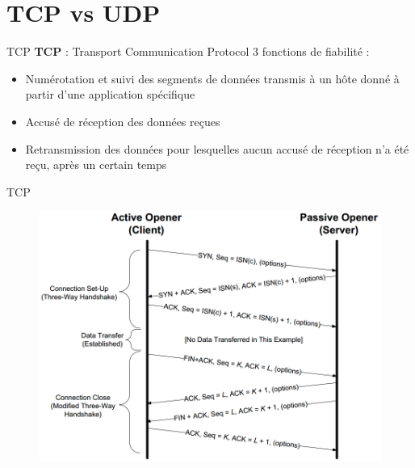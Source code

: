 \documentclass{beamer}
\begin{document}
\section{TCP vs UDP}

	\begin{frame}{TCP}
		\textbf{TCP} : Transport Communication Protocol
		3 fonctions de fiabilité : 
		\begin{itemize}
			\item[\textbullet] Numérotation et suivi des segments de données transmis à un hôte donné à partir d'une application spécifique
			\item[\textbullet] Accusé de réception des données reçues
			\item[\textbullet] Retransmission des données pour lesquelles aucun accusé de réception n'a été reçu, après un certain temps
		\end{itemize}
	\end{frame}

	\begin{frame}{TCP}
		\begin{figure}
			\includegraphics[scale=0.3	]{TCP.png}
		\end{figure}
	\end{frame}	
\end{document}
